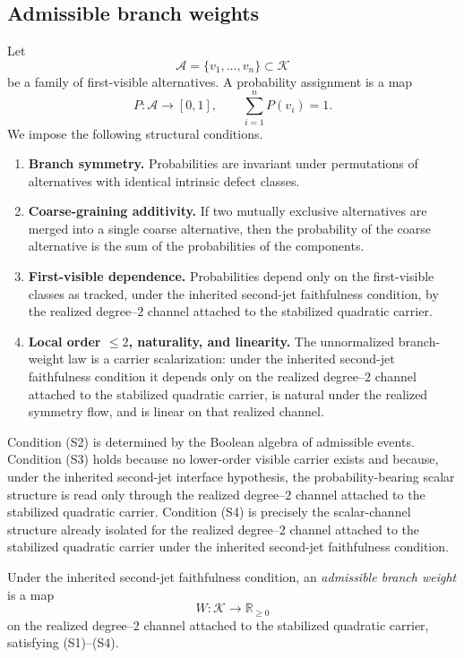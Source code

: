 \subsection{Admissible branch weights}
Let
\[
	\mathcal A=\{v_1,\dots,v_n\}\subset\mathcal K
\]
be a family of first-visible alternatives.
A probability assignment is a map
\[
	P:\mathcal A\to[0,1],
	\qquad
	\sum_{i=1}^n P(v_i)=1.
\]
We impose the following structural conditions.
\begin{enumerate}[label=\textup{(S\arabic*)}]
	\item \label{S1}
	      \textbf{Branch symmetry.}
	      Probabilities are invariant under permutations of alternatives with
	      identical intrinsic defect classes.
	\item \label{S2}
	      \textbf{Coarse-graining additivity.}
	      If two mutually exclusive alternatives are merged into a single coarse
	      alternative, then the probability of the coarse alternative is the sum
	      of the probabilities of the components.
	\item \label{S3}
	      \textbf{First-visible dependence.}
	      Probabilities depend only on the first-visible classes as
	      tracked, under the inherited second-jet faithfulness condition,
	      by the realized degree--\(2\) channel attached to the
	      stabilized quadratic carrier.
	\item \label{S4}
	      \textbf{Local order \(\le 2\), naturality, and linearity.}
	      The unnormalized branch-weight law is a carrier scalarization:
	      under the inherited second-jet faithfulness condition it depends
	      only on the realized degree--\(2\) channel attached to the
	      stabilized quadratic carrier, is natural under the realized
	      symmetry flow, and is linear on that realized channel.
\end{enumerate}
Condition \textup{(S2)} is determined by the Boolean algebra of admissible
events.  Condition \textup{(S3)} holds because no lower-order visible
carrier exists and because, under the inherited second-jet interface
hypothesis, the probability-bearing scalar structure is read only
through the realized degree--\(2\) channel attached to the
stabilized quadratic carrier.  Condition \textup{(S4)} is precisely
the scalar-channel structure already isolated for the realized
degree--\(2\) channel attached to the stabilized quadratic carrier
under the inherited second-jet faithfulness condition.
\begin{definition}
	\label{def:admissible-branch-weight}
	Under the inherited second-jet faithfulness condition, an
	\emph{admissible branch weight} is a map
	\[
		W:\mathcal K\to\mathbb R_{\ge 0}
	\]
	on the realized degree--\(2\) channel attached to the stabilized
	quadratic carrier, satisfying \textup{(S1)--(S4)}.
\end{definition}

